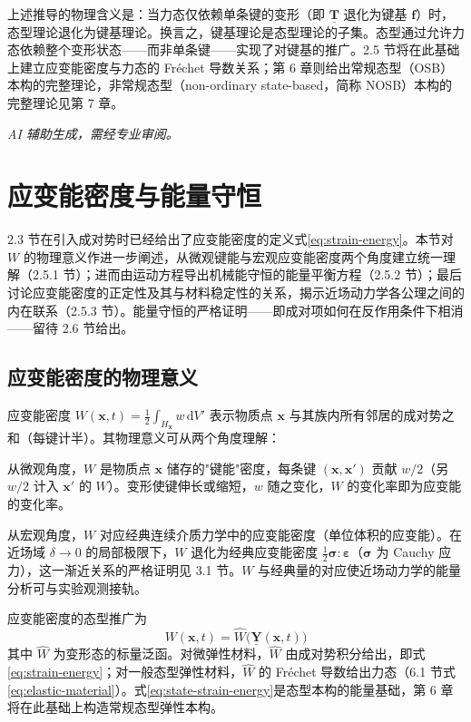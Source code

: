 上述推导的物理含义是：当力态仅依赖单条键的变形（即 $\underline{\mathbf{T}}$ 退化为键基 $\mathbf{f}$）时，态型理论退化为键基理论。换言之，键基理论是态型理论的子集。态型通过允许力态依赖整个变形状态——而非单条键——实现了对键基的推广。2.5 节将在此基础上建立应变能密度与力态的 Fr\'echet 导数关系；第 6 章则给出常规态型（OSB）本构的完整理论，非常规态型（non-ordinary state-based，简称 NOSB）本构的完整理论见第 7 章。

\emph{AI 辅助生成，需经专业审阅。}

\section{应变能密度与能量守恒}

2.3 节在引入成对势时已经给出了应变能密度的定义式\eqref{eq:strain-energy}。本节对 $W$ 的物理意义作进一步阐述，从微观键能与宏观应变能密度两个角度建立统一理解（2.5.1 节）；进而由运动方程导出机械能守恒的能量平衡方程（2.5.2 节）；最后讨论应变能密度的正定性及其与材料稳定性的关系，揭示近场动力学各公理之间的内在联系（2.5.3 节）。能量守恒的严格证明——即成对项如何在反作用条件下相消——留待 2.6 节给出。

\subsection{应变能密度的物理意义}

应变能密度 $W(\mathbf{x},t)=\frac{1}{2}\int_{H_{\mathbf{x}}}w\,\mathrm{d}V'$ 表示物质点 $\mathbf{x}$ 与其族内所有邻居的成对势之和（每键计半）。其物理意义可从两个角度理解：

从微观角度，$W$ 是物质点 $\mathbf{x}$ 储存的"键能"密度，每条键 $(\mathbf{x},\mathbf{x}')$ 贡献 $w/2$（另 $w/2$ 计入 $\mathbf{x}'$ 的 $W$）。变形使键伸长或缩短，$w$ 随之变化，$W$ 的变化率即为应变能的变化率。

从宏观角度，$W$ 对应经典连续介质力学中的应变能密度（单位体积的应变能）。在近场域 $\delta\to 0$ 的局部极限下，$W$ 退化为经典应变能密度 $\frac{1}{2}\boldsymbol{\sigma}:\boldsymbol{\varepsilon}$（$\boldsymbol{\sigma}$ 为 Cauchy 应力），这一渐近关系的严格证明见 3.1 节。$W$ 与经典量的对应使近场动力学的能量分析可与实验观测接轨。

应变能密度的态型推广为
\begin{equation}
  W(\mathbf{x},t)=\hat{W}\bigl(\underline{\mathbf{Y}}(\mathbf{x},t)\bigr)
  \label{eq:state-strain-energy}
\end{equation}
其中 $\hat{W}$ 为变形态的标量泛函。对微弹性材料，$\hat{W}$ 由成对势积分给出，即式\eqref{eq:strain-energy}；对一般态型弹性材料，$\hat{W}$ 的 Fréchet 导数给出力态（6.1 节式\eqref{eq:elastic-material}）。式\eqref{eq:state-strain-energy}是态型本构的能量基础，第 6 章将在此基础上构造常规态型弹性本构。

